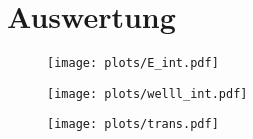 \newpage
\section{Auswertung}

\begin{figure}
    \centering
    \texttt{[image: plots/E\_int.pdf]}
    \caption{}
\end{figure}

\begin{figure}
    \centering
    \texttt{[image: plots/welll\_int.pdf]}
    \caption{}
\end{figure}

\begin{figure}
    \centering
    \texttt{[image: plots/trans.pdf]}
    \caption{}
\end{figure}
\label{sec:Auswertung}
